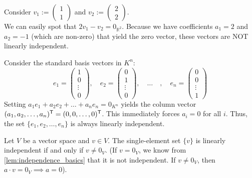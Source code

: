 \begin{example}
Consider $v_1 := \left(\begin{smallmatrix} 1 \\ 1 \end{smallmatrix}\right)$ and $v_2 := \left(\begin{smallmatrix} 2 \\ 2 \end{smallmatrix}\right)$. \\
We can easily spot that $2 v_1 - v_2 = 0_{\mathbb{R}^2}$. Because we have coefficients $a_1 = 2$ and $a_2 = -1$ (which are non-zero) that yield the zero vector, these vectors are NOT linearly independent.
\end{example}

\begin{example}
\label{ex:standard_basis_independent}
Consider the standard basis vectors in $K^n$:
\[
e_1 = \begin{pmatrix} 1 \\ 0 \\ \vdots \\ 0 \end{pmatrix}, \quad e_2 = \begin{pmatrix} 0 \\ 1 \\ \vdots \\ 0 \end{pmatrix}, \quad \dots \quad, \quad e_n = \begin{pmatrix} 0 \\ 0 \\ \vdots \\ 1 \end{pmatrix}
\]
Setting $a_1 e_1 + a_2 e_2 + \dots + a_n e_n = 0_{K^n}$ yields the column vector $(a_1, a_2, \dots, a_n)^{\mathsf{T}} = (0, 0, \dots, 0)^{\mathsf{T}}$. This immediately forces $a_i = 0$ for all $i$. Thus, the set $\{e_1, e_2, \dots, e_n\}$ is always linearly independent.
\end{example}

\begin{example}
Let $V$ be a vector space and $v \in V$. The single-element set $\{v\}$ is linearly independent if and only if $v \ne 0_V$. (If $v = 0_V$, we know from \cref{lem:independence_basics} that it is not independent. If $v \ne 0_V$, then $a \cdot v = 0_V \implies a = 0$).
\end{example}

